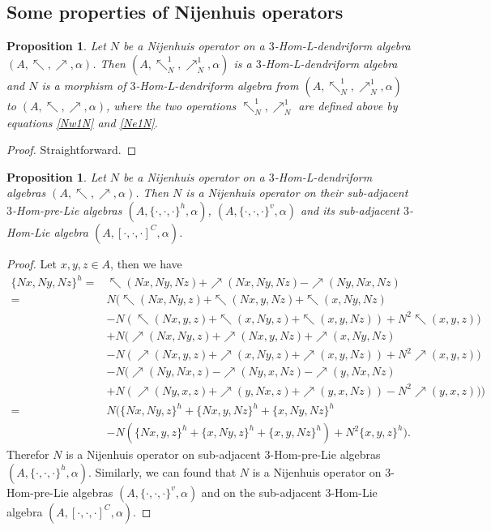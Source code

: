 \documentclass[a4paper,11pt]{article}
\def\nw{\nwarrow}
\def\ne{\nearrow}
\newtheorem{pro}[thm]{Proposition}
\theoremstyle{definition}
\begin{document}
\subsection{Some properties of Nijenhuis operators}
\begin{pro}
  Let $N$ be a Nijenhuis operator on a $3$-Hom-L-dendriform algebra $(A,\nw,\ne,\alpha)$. Then $(A,\nw^1_N,\ne^1_N,\alpha)$ is a $3$-Hom-L-dendriform algebra and $N$ is a morphism of $3$-Hom-L-dendriform algebra from  $(A,\nw^1_N,\ne^1_N,\alpha)$ to  $(A,\nw,\ne,\alpha)$, where the two operations $\nw^1_N,\ne^1_N$ are defined above by equations \eqref{Nw1N} and \eqref{Ne1N}.
\end{pro}
\begin{proof}Straightforward.
\end{proof}
\begin{pro}
Let $N$ be a Nijenhuis operator on a $3$-Hom-L-dendriform algebras $(A,\nw,\ne,\alpha)$. Then $N$ is a  Nijenhuis operator on their sub-adjacent  $3$-Hom-pre-Lie algebras  $(A,\{\cdot,\cdot,\cdot\}^h,\alpha)$, $(A,\{\cdot,\cdot,\cdot\}^v,\alpha)$ and its  sub-adjacent  $3$-Hom-Lie algebra  $(A,[\cdot,\cdot,\cdot]^C,\alpha)$.

\end{pro}
\begin{proof}  Let $x,y,z\in A$, then we have
\begin{align*}
   \{Nx,Ny,Nz\}^h=&\nw(Nx,Ny,Nz)+\ne(Nx,Ny,Nz)-\ne(Ny,Nx,Nz)  \\
   =&N(\nw(Nx,Ny,z)+\nw(Nx,y,Nz)+\nw(x,Ny,Nz)\\
&-N(\nw(Nx,y,z)+\nw(x,Ny,z)+\nw(x,y,Nz))+N^2\nw(x,y,z))\\
&+N(\ne(Nx,Ny,z)+\ne(Nx,y,Nz)+\ne(x,Ny,Nz)\nonumber\\
&-N(\ne(Nx,y,z)+\ne(x,Ny,z)+\ne(x,y,Nz))+N^2\ne(x,y,z))\\
&-N(\ne(Ny,Nx,z)-\ne(Ny,x,Nz)-\ne(y,Nx,Nz)\\\
&+N(\ne(Ny,x,z)+\ne(y,Nx,z)+\ne(y,x,Nz))-N^2\ne(y,x,z)))\\
=&N(\{Nx,Ny,z\}^h+\{Nx,y,Nz\}^h+\{x,Ny,Nz\}^h\nonumber\\
&-N(\{Nx,y,z\}^h+\{x,Ny,z\}^h+\{x,y,Nz\}^h)+N^2\{x,y,z\}^h).
\end{align*}
Therefor  $N$ is a Nijenhuis operator on  sub-adjacent  $3$-Hom-pre-Lie algebras  $(A,\{\cdot,\cdot,\cdot\}^h,\alpha)$. Similarly, we can found that $N$ is a Nijenhuis operator on  $3$-Hom-pre-Lie algebras  $(A,\{\cdot,\cdot,\cdot\}^v,\alpha)$ and on the  sub-adjacent  $3$-Hom-Lie algebra  $(A,[\cdot,\cdot,\cdot]^C,\alpha)$.
\end{proof}
\end{document}
